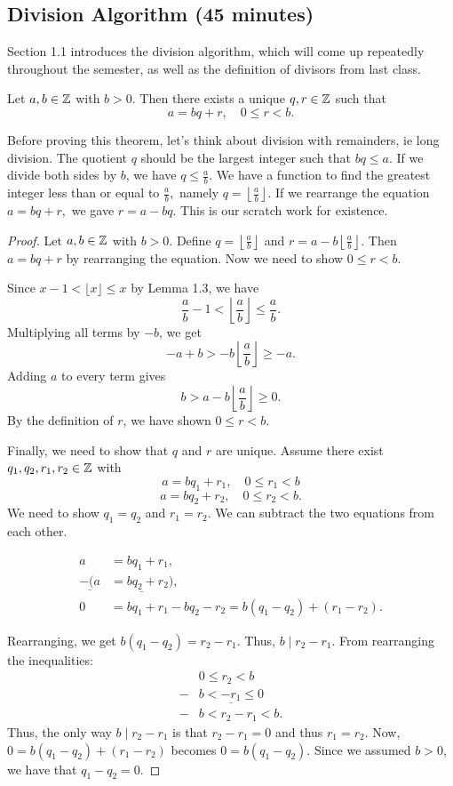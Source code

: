 \documentclass{ximera}
\begin{document}
\subsection{Division Algorithm (45 minutes)}
Section 1.1 introduces the division algorithm, which will come up repeatedly throughout the semester, as well as the definition of divisors from last class.

\begin{thm*}
 Let $a,b\in\mathbb Z$ with $b>0$. Then there exists a unique $q,r\in\mathbb Z$ such that \[a=bq+r, \quad 0\leq r <b.\]
\end{thm*}

Before proving this theorem, let's think about division with remainders, ie long division. The quotient $q$ should be the largest integer such that $bq\leq a$. If we divide both sides by $b$, we have $q\leq\frac{a}{b}$. We have a function to find the greatest integer less than or equal to $\frac{a}{b},$ namely $q=\left\lfloor\frac{a}{b}\right\rfloor$. If we rearrange the equation $a=bq+r,$ we gave $r=a-bq$. This is our scratch work for existence.

\begin{proof} Let $a,b\in\mathbb Z$ with $b>0$.
Define $q=\left\lfloor\frac{a}{b}\right\rfloor$ and $r=a-b\left\lfloor\frac{a}{b}\right\rfloor$. Then $a=bq+r$ by rearranging the equation. 
Now we need to show $0\leq r<b$. 

Since $x-1<\lfloor x\rfloor\leq x$ by Lemma 1.3, we have \[\frac{a}{b}-1<\left\lfloor\frac{a}{b}\right\rfloor\leq\frac{a}{b}.\] 
Multiplying all terms by $-b$, we get 
 \[-a+b>-b\left\lfloor\frac{a}{b}\right\rfloor\geq-a.\]
 Adding $a$ to every term gives \[b>a-b\left\lfloor\frac{a}{b}\right\rfloor\geq 0.\] 
By the definition of $r$, we have shown $0\leq r <b$.

Finally, we need to show that $q$ and $r$ are unique.
Assume there exist $q_1,q_2,r_1,r_2\in\mathbb Z$ with \[a=bq_1+r_1, \quad 0\leq r_1<b\]
 \[a=bq_2+r_2, \quad 0\leq r_2<b.\]
 We need to show $q_1=q_2$ and $r_1=r_2$. We can subtract the two equations from each other. 
 
\begin{align*}
  a&=bq_1+r_1, \\
\underline{ -(a}&\underline{=bq_2+r_2)}, \\
 0&=bq_1+r_1-bq_2-r_2=b(q_1-q_2)+(r_1-r_2) . 
\end{align*}

Rearranging, we get $b(q_1-q_2)=r_2-r_1$. Thus, $b\mid r_2-r_1$. From rearranging the inequalities:
\begin{align*}
 & 0\leq r_2<b\\
- & \underline{b< -r_1\leq 0}\\
 -&b<r_2-r_1<b.
\end{align*}
Thus, the only way $b\mid r_2-r_1$ is that $r_2-r_1=0$ and thus $r_1=r_2$. Now, $0=b(q_1-q_2)+(r_1-r_2)$ becomes $0=b(q_1-q_2)$. Since we assumed $b>0$, we have that $q_1-q_2=0$. 
\end{proof}
\end{document}
